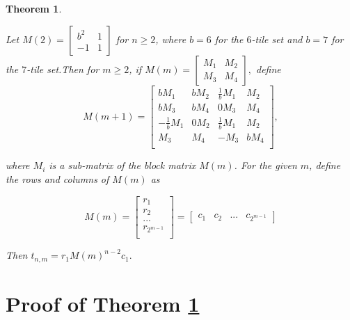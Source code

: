 \documentclass[12pt]{article}
\theoremstyle{plain}
\newtheorem{thm}{Theorem}
\theoremstyle{definition}
\theoremstyle{remark}
\theoremstyle{definition}
\begin{document}
\begin{thm}
\label{thm: messy mosaics}

Let $
M(2) = \begin{bmatrix}
b^2 & 1 \\
-1 & 1
\end{bmatrix}
$ for $n \geq 2$, where $b = 6$ for the $6$-tile set and $b = 7$ for the $7$-tile set.Then for $m \geq 2$, if
$
M(m) = \begin{bmatrix}
M_1 & M_2 \\
M_3 & M_4
\end{bmatrix},
$ define
$$
M(m+1) = \begin{bmatrix}
bM_1 & bM_2 & \frac{1}{b}M_1 & M_2 \\
bM_3 & bM_4 & 0M_3 & M_4 \\
-\frac{1}{b}M_1 & 0M_2 & \frac{1}{b}M_1 & M_2 \\
M_3 & M_4 & -M_3 & bM_4 \\
\end{bmatrix},
$$

where $M_i$ is a sub-matrix of the block matrix $M(m)$. For the given $m$, define the rows and columns of $M(m)$ as

$$
M(m) = 
\begin{bmatrix}
    r_1 \\
    r_2 \\
    ... \\
    r_{2^{m-1}} \\
\end{bmatrix} =
\begin{bmatrix}
    c_1 & c_2 & ... & c_{2^{m-1}}
\end{bmatrix} 
$$

Then $t_{n,m} = r_1 M(m)^{n-2}c_1 .$
\end{thm}

\section{Proof of Theorem \ref{thm: messy mosaics}}
\end{document}

